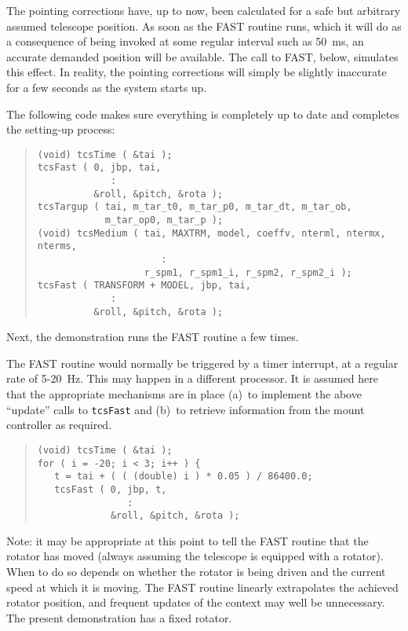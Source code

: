 \documentclass[12pt,fleqn,twoside]{article}
\renewcommand{\_}{{\tt\char'137}}     %
\begin{document}
The pointing corrections have, up to now, been calculated for a
safe but arbitrary assumed telescope position.  As soon as the
FAST routine runs, which it will do as a consequence of being
invoked at some regular interval such as 50~ms, an accurate
demanded position will be available.  The call to FAST, below,
simulates this effect.  In reality, the pointing corrections
will simply be slightly inaccurate for a few seconds as the
system starts up.

The following code makes sure everything is
completely up to date and completes the setting-up process:
\begin{quote}
\begin{small}
\begin{verbatim}
(void) tcsTime ( &tai );
tcsFast ( 0, jbp, tai,
             :
          &roll, &pitch, &rota );
tcsTargup ( tai, m_tar_t0, m_tar_p0, m_tar_dt, m_tar_ob,
            m_tar_op0, m_tar_p );
(void) tcsMedium ( tai, MAXTRM, model, coeffv, nterml, ntermx, nterms,
                      :
                   r_spm1, r_spm1_i, r_spm2, r_spm2_i );
tcsFast ( TRANSFORM + MODEL, jbp, tai,
             :
          &roll, &pitch, &rota );
\end{verbatim}\end{small}
\end{quote}
Next, the demonstration runs the FAST routine a few times.

The FAST routine would normally be triggered by a timer interrupt,
at a regular rate of 5-20~Hz.  This may happen in a different
processor.  It is assumed here that the appropriate mechanisms are
in place (a)~to implement the above ``update'' calls to {\tt tcsFast} and
(b)~to retrieve information from the mount controller as required.
\begin{quote}
\begin{small}
\begin{verbatim}
(void) tcsTime ( &tai );
for ( i = -20; i < 3; i++ ) {
   t = tai + ( ( (double) i ) * 0.05 ) / 86400.0;
   tcsFast ( 0, jbp, t,
                :
             &roll, &pitch, &rota );
\end{verbatim}\end{small}
\end{quote}
Note:  it may be appropriate at this point to tell the FAST
routine that the rotator has moved (always assuming the
telescope is equipped with a rotator).  When to do so depends
on whether the rotator is being driven and the current speed
at which it is moving.  The FAST routine linearly extrapolates
the achieved rotator position, and frequent updates of the
context may well be unnecessary.  The present demonstration
has a fixed rotator.
\end{document}

